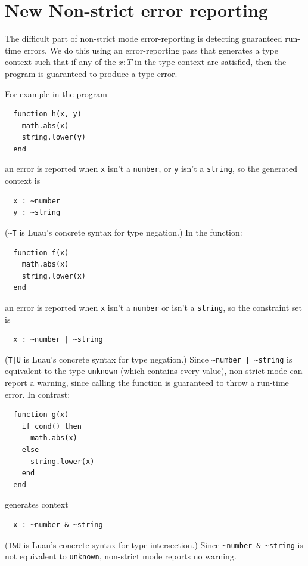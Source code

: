 \documentclass[sigplan]{acmart}
\begin{document}
\section{New Non-strict error reporting}

The difficult part of non-strict mode error-reporting is detecting
guaranteed run-time errors. We do this using an error-reporting
pass that generates a type context such that if any of the $x : T$ in
the type context are satisfied, then the program is guaranteed to
produce a type error.

For example in the program
\begin{verbatim}
  function h(x, y)
    math.abs(x)
    string.lower(y)
  end
\end{verbatim}
an error is reported when \verb|x| isn’t a \verb|number|, or \verb|y| isn’t a \verb|string|, so the generated context is
\begin{verbatim}
  x : ~number
  y : ~string
\end{verbatim}
(\verb|~T| is Luau's concrete syntax for type negation.)
In the function:
\begin{verbatim}
  function f(x)
    math.abs(x)
    string.lower(x)
  end
\end{verbatim}
an error is reported when \verb|x| isn’t a \verb|number| or isn’t a \verb|string|, so the constraint set is
\begin{verbatim}
  x : ~number | ~string
\end{verbatim}
(\verb"T|U" is Luau's concrete syntax for type negation.)
Since \verb"~number | ~string" is equivalent to the type \verb|unknown| (which contains every value),
non-strict mode can report a warning, since calling the function is guaranteed to throw a run-time error.
In contrast:
\begin{verbatim}
  function g(x)
    if cond() then
      math.abs(x)
    else
      string.lower(x)
    end
  end
\end{verbatim}
generates context
\begin{verbatim}
  x : ~number & ~string
\end{verbatim}
(\verb|T&U| is Luau's concrete syntax for type intersection.)
Since \verb|~number & ~string| is not equivalent to \verb|unknown|, non-strict mode reports no warning.
\end{document}
